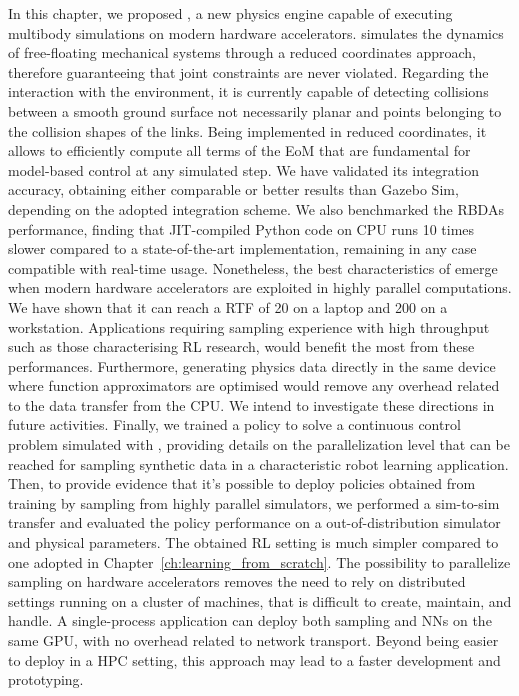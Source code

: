 In this chapter, we proposed \jaxsim, a new physics engine capable of executing multibody simulations on modern hardware accelerators.
\jaxsim simulates the dynamics of free-floating mechanical systems through a reduced coordinates approach, therefore guaranteeing that joint constraints are never violated.
Regarding the interaction with the environment, it is currently capable of detecting collisions between a smooth ground surface not necessarily planar and points belonging to the collision shapes of the links.
Being implemented in reduced coordinates, it allows to efficiently compute all terms of the \ac{EoM} that are fundamental for model-based control at any simulated step.
We have validated its integration accuracy, obtaining either comparable or better results than Gazebo Sim, depending on the adopted integration scheme.
We also benchmarked the \acp{RBDA} performance, finding that \ac{JIT}-compiled Python code on \ac{CPU} runs 10 times slower compared to a state-of-the-art \cpp implementation, remaining in any case compatible with real-time usage.
Nonetheless, the best characteristics of \jaxsim emerge when modern hardware accelerators are exploited in highly parallel computations.
We have shown that it can reach a \ac{RTF} of 20 on a laptop and 200 on a workstation.
Applications requiring sampling experience with high throughput such as those characterising \ac{RL} research, would benefit the most from these performances.
Furthermore, generating physics data directly in the same device where function approximators are optimised would remove any overhead related to the data transfer from the \ac{CPU}.
We intend to investigate these directions in future activities.
Finally, we trained a policy to solve a continuous control problem simulated with \jaxsim, providing details on the parallelization level that can be reached for sampling synthetic data in a characteristic robot learning application.
Then, to provide evidence that it's possible to deploy policies obtained from training by sampling from highly parallel simulators, we performed a sim-to-sim transfer and evaluated the policy performance on a out-of-distribution simulator and physical parameters.
The obtained \ac{RL} setting is much simpler compared to one adopted in Chapter~\ref{ch:learning_from_scratch}.
The possibility to parallelize sampling on hardware accelerators removes the need to rely on distributed settings running on a cluster of machines, that is difficult to create, maintain, and handle.
A single-process application can deploy both sampling and \acp{NN} on the same \ac{GPU}, with no overhead related to network transport.
Beyond being easier to deploy in a {\small HPC} setting, this approach may lead to a faster development and prototyping.


